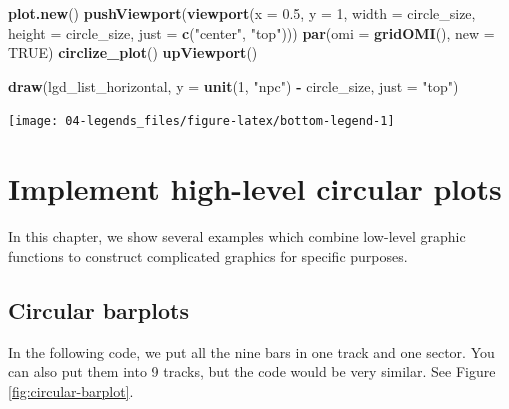 \documentclass[]{book}
\newenvironment{Shaded}{\begin{snugshade}}{\end{snugshade}}
\newcommand{\KeywordTok}[1]{\textcolor[rgb]{0.13,0.29,0.53}{\textbf{#1}}}
\newcommand{\DataTypeTok}[1]{\textcolor[rgb]{0.13,0.29,0.53}{#1}}
\newcommand{\DecValTok}[1]{\textcolor[rgb]{0.00,0.00,0.81}{#1}}
\newcommand{\FloatTok}[1]{\textcolor[rgb]{0.00,0.00,0.81}{#1}}
\newcommand{\StringTok}[1]{\textcolor[rgb]{0.31,0.60,0.02}{#1}}
\newcommand{\OtherTok}[1]{\textcolor[rgb]{0.56,0.35,0.01}{#1}}
\newcommand{\OperatorTok}[1]{\textcolor[rgb]{0.81,0.36,0.00}{\textbf{#1}}}
\newcommand{\NormalTok}[1]{#1}
\begin{document}
\begin{Shaded}
\begin{Highlighting}[]
\KeywordTok{plot.new}\NormalTok{()}
\KeywordTok{pushViewport}\NormalTok{(}\KeywordTok{viewport}\NormalTok{(}\DataTypeTok{x =} \FloatTok{0.5}\NormalTok{, }\DataTypeTok{y =} \DecValTok{1}\NormalTok{, }\DataTypeTok{width =}\NormalTok{ circle_size, }\DataTypeTok{height =}\NormalTok{ circle_size,}
    \DataTypeTok{just =} \KeywordTok{c}\NormalTok{(}\StringTok{"center"}\NormalTok{, }\StringTok{"top"}\NormalTok{)))}
\KeywordTok{par}\NormalTok{(}\DataTypeTok{omi =} \KeywordTok{gridOMI}\NormalTok{(), }\DataTypeTok{new =} \OtherTok{TRUE}\NormalTok{)}
\KeywordTok{circlize_plot}\NormalTok{()}
\KeywordTok{upViewport}\NormalTok{()}

\KeywordTok{draw}\NormalTok{(lgd_list_horizontal, }\DataTypeTok{y =} \KeywordTok{unit}\NormalTok{(}\DecValTok{1}\NormalTok{, }\StringTok{"npc"}\NormalTok{) }\OperatorTok{-}\StringTok{ }\NormalTok{circle_size, }\DataTypeTok{just =} \StringTok{"top"}\NormalTok{)}
\end{Highlighting}
\end{Shaded}

\begin{center}\texttt{[image: 04-legends\_files/figure-latex/bottom-legend-1]} \end{center}

\chapter{Implement high-level circular plots}\label{high-level-plots}

In this chapter, we show several examples which combine low-level
graphic functions to construct complicated graphics for specific
purposes.

\section{Circular barplots}\label{circular-barplot}

In the following code, we put all the nine bars in one track and one
sector. You can also put them into 9 tracks, but the code would be very
similar. See Figure \ref{fig:circular-barplot}.
\end{document}
